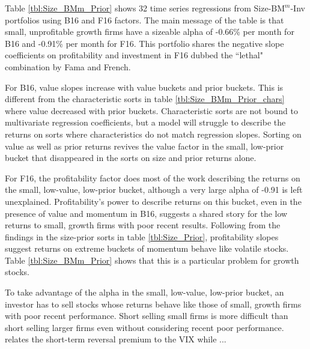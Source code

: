 
Table \ref{tbl:Size_BMm_Prior} shows 32 time series regressions from
Size-$\text{BM}^{m}$-Inv portfolios using B16 and F16 factors.
The main message of the table is that small, unprofitable growth firms have a
sizeable alpha of -0.66\% per month for B16 and -0.91\% per month for F16.
This portfolio shares the negative slope coefficients on profitability and
investment in F16 dubbed the ``lethal" combination by Fama and French.

For B16, value slopes increase with value buckets and prior buckets.
This is different from the characteristic sorts in table
\ref{tbl:Size_BMm_Prior_chars} where value decreased with prior buckets.
Characteristic sorts are not bound to multivariate regression coefficients, but
a model will struggle to describe the returns on sorts where characteristics do
not match regression slopes.
Sorting on value as well as prior returns revives the value factor in the
small, low-prior bucket that disappeared in the sorts on size and prior returns
alone.

For F16, the profitability factor does most of the work describing the returns
on the small, low-value, low-prior bucket, although a very large alpha of -0.91
is left unexplained.
Profitability's power to describe returns on this bucket, even in the presence
of value and momentum in B16, suggests a shared story for the low returns to
small, growth firms with poor recent results.
Following from the findings in the size-prior sorts in table
\ref{tbl:Size_Prior}, profitability slopes suggest returns on extreme buckets
of momentum behave like volatile stocks.
Table \ref{tbl:Size_BMm_Prior} shows that this is a particular problem for
growth stocks.

To take advantage of the alpha in the small, low-value, low-prior bucket, an
investor has to sell stocks whose returns behave like those of small, growth
firms with poor recent performance.
Short selling small firms is more difficult than short selling larger firms
even without considering recent poor performance.
\textcite{nagel2012evaporating} relates the short-term reversal premium to the
VIX while \textcite{nagel2005short} ...
